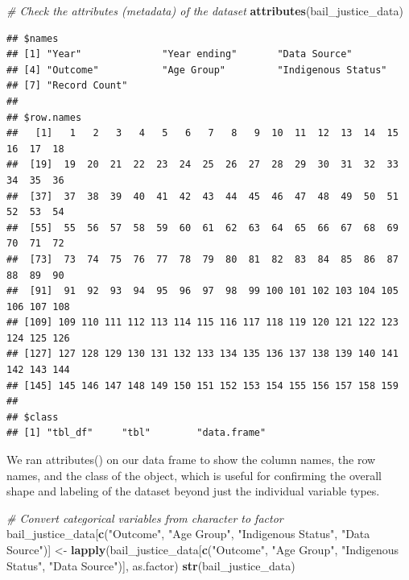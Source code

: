 \documentclass[
]{article}
\newenvironment{Shaded}{\begin{snugshade}}{\end{snugshade}}
\newcommand{\CommentTok}[1]{\textcolor[rgb]{0.56,0.35,0.01}{\textit{#1}}}
\newcommand{\FunctionTok}[1]{\textcolor[rgb]{0.13,0.29,0.53}{\textbf{#1}}}
\newcommand{\NormalTok}[1]{#1}
\newcommand{\OtherTok}[1]{\textcolor[rgb]{0.56,0.35,0.01}{#1}}
\newcommand{\StringTok}[1]{\textcolor[rgb]{0.31,0.60,0.02}{#1}}
\begin{document}
\begin{Shaded}
\begin{Highlighting}[]
\CommentTok{\# Check the attributes (metadata) of the dataset}
\FunctionTok{attributes}\NormalTok{(bail\_justice\_data)}
\end{Highlighting}
\end{Shaded}

\begin{verbatim}
## $names
## [1] "Year"              "Year ending"       "Data Source"      
## [4] "Outcome"           "Age Group"         "Indigenous Status"
## [7] "Record Count"     
## 
## $row.names
##   [1]   1   2   3   4   5   6   7   8   9  10  11  12  13  14  15  16  17  18
##  [19]  19  20  21  22  23  24  25  26  27  28  29  30  31  32  33  34  35  36
##  [37]  37  38  39  40  41  42  43  44  45  46  47  48  49  50  51  52  53  54
##  [55]  55  56  57  58  59  60  61  62  63  64  65  66  67  68  69  70  71  72
##  [73]  73  74  75  76  77  78  79  80  81  82  83  84  85  86  87  88  89  90
##  [91]  91  92  93  94  95  96  97  98  99 100 101 102 103 104 105 106 107 108
## [109] 109 110 111 112 113 114 115 116 117 118 119 120 121 122 123 124 125 126
## [127] 127 128 129 130 131 132 133 134 135 136 137 138 139 140 141 142 143 144
## [145] 145 146 147 148 149 150 151 152 153 154 155 156 157 158 159
## 
## $class
## [1] "tbl_df"     "tbl"        "data.frame"
\end{verbatim}

We ran attributes() on our data frame to show the column names, the row
names, and the class of the object, which is useful for confirming the
overall shape and labeling of the dataset beyond just the individual
variable types.

\begin{Shaded}
\begin{Highlighting}[]
\CommentTok{\# Convert categorical variables from character to factor}
\NormalTok{bail\_justice\_data[}\FunctionTok{c}\NormalTok{(}\StringTok{"Outcome"}\NormalTok{, }\StringTok{"Age Group"}\NormalTok{, }\StringTok{"Indigenous Status"}\NormalTok{, }\StringTok{"Data Source"}\NormalTok{)] }\OtherTok{\textless{}{-}} \FunctionTok{lapply}\NormalTok{(bail\_justice\_data[}\FunctionTok{c}\NormalTok{(}\StringTok{"Outcome"}\NormalTok{, }\StringTok{"Age Group"}\NormalTok{, }\StringTok{"Indigenous Status"}\NormalTok{, }\StringTok{"Data Source"}\NormalTok{)], as.factor)}
\FunctionTok{str}\NormalTok{(bail\_justice\_data)}
\end{Highlighting}
\end{Shaded}
\end{document}
